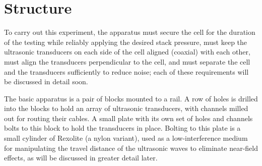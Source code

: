 
\section{Structure}
To carry out this experiment, the apparatus must secure the cell for the duration of the testing while reliably applying the desired stack pressure, must keep the ultrasonic transducers on each side of the cell aligned (coaxial) with each other, must align the transducers perpendicular to the cell, and must separate the cell and the transducers sufficiently to reduce noise; each of these requirements will be discussed in detail soon.


The basic apparatus is a pair of blocks mounted to a rail. A row of holes is drilled into the blocks to hold an array of ultrasonic transducers, with channels milled out for routing their cables. A small plate with its own set of holes and channels bolts to this block to hold the transducers in place. Bolting to this plate is a small cylinder of Rexolite (a nylon variant), used as a low-interference medium for manipulating the travel distance of the ultrasonic waves to eliminate near-field effects, as will be discussed in greater detail later.


